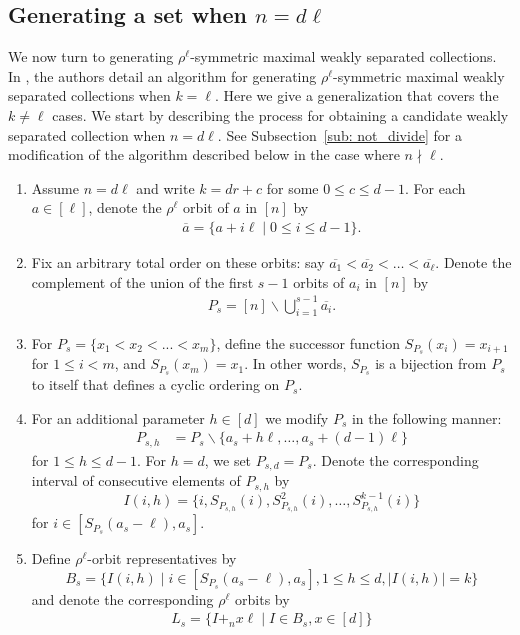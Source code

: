 \documentclass[11pt]{amsart}
\theoremstyle{plain}
\theoremstyle{definition}
\begin{document}
\subsection{Generating a set when $n=d\ell$}\label{sec: n=dl} We now turn to generating $\rho^\ell$-symmetric maximal weakly separated collections. In \cite[Section 5]{PasqTZ2019}, the authors detail an algorithm for generating $\rho^\ell$-symmetric maximal weakly separated collections when $k= \ell$. Here we give a generalization that covers the $k \neq \ell$ cases. We start by describing the process for obtaining a candidate weakly separated collection when $n=d\ell$. See Subsection~\ref{sub: not_divide} for a modification of the algorithm described below in the case where $n\nmid \ell$. 
\begin{enumerate}
    \item Assume $n=d\ell$ and write $k=dr+c$ for some $0\leq c\leq d-1$. For each $a \in [\ell]$, denote the $\rho^\ell$ orbit of $a$ in $[n]$ by 
    \begin{align*}
        \overline{a} = \{ a+i\ell \mid 0\leq i\leq d-1\}.
    \end{align*}
    \item Fix an arbitrary total order on these orbits: say $\overline{a_1} < \overline{a_2} < \dots <\overline{a_{\ell}}$. Denote the complement of the union of the first $s-1$ orbits of $a_i$ in $[n]$ by
    \begin{align*}
        P_s = [n] \backslash  \bigcup_{i=1}^{s-1} \overline{a_i}.
    \end{align*}
    \item For $P_s =\{ x_1< x_2 <...<x_m\}$, define the successor function $S_{P_s}(x_i) = x_{i+1}$ for $1 \leq i < m$, and $S_{P_s}(x_m) = x_1$. In other words, $S_{P_s} $ is a bijection from $P_s$ to itself that defines a cyclic ordering on $P_s$. 

 \item  For an additional parameter $h\in [d]$ we modify $P_s$ in the following manner: \begin{align*}
P_{s,h}&=P_s\backslash\{a_s+h\ell,\dots,a_s+(d-1)\ell\}
    \end{align*}
    for $1\leq h\leq d-1$. For $h=d$, we set $P_{s, d}= P_s$.  Denote the corresponding interval of consecutive elements of $P_{s, h}$ by
    $$I(i,h)=\{i,S_{P_{s,h}}(i),S^2_{P_{s,h}}(i),\dots,S^{k-1}_{P_{s,h}}(i)\}$$ for $i\in [S_{P_s}(a_s-\ell), a_s]$. 
   

    \item Define $\rho^\ell$-orbit representatives by
   $$
        B_s = \{I(i,h) \mid i \in [S_{P_s}(a_s-\ell), a_s], 1\leq h\leq d,|I(i,h)|=k\} 
    $$
    and denote the corresponding $\rho^\ell$ orbits by 
     \begin{align*}
        L_s = \{I +_n x \ell \mid I \in B_s, x \in [d]\}
    \end{align*}


\end{enumerate}
\end{document}
